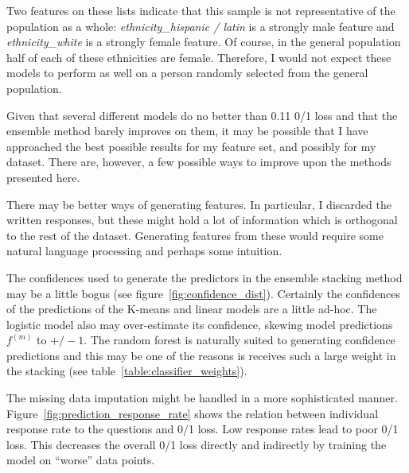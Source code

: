 \documentclass{article} %
\begin{document}
Two features on these lists indicate that this sample is not representative of the population as a whole: \textit{ethnicity\_hispanic / latin} is a strongly male feature and \textit{ethnicity\_white} is a strongly female feature.  Of course, in the general population half of each of these ethnicities are female.  Therefore, I would not expect these models to perform as well on a person randomly selected from the general population.


Given that several different models do no better than 0.11 0/1 loss and that the ensemble method barely improves on them, it may be possible that I have approached the best possible results for my feature set, and possibly for my dataset.  There are, however, a few possible ways to improve upon the methods presented here.

There may be better ways of generating features.  In particular, I discarded the written responses, but these might hold a lot of information which is orthogonal to the rest of the dataset.  Generating features from these would require some natural language processing and perhaps some intuition.

The confidences used to generate the predictors in the ensemble stacking method may be a little bogus (see figure~\ref{fig:confidence_dist}).  Certainly the confidences of the predictions of the K-means and linear models are a little ad-hoc.  The logistic model also may over-estimate its confidence, skewing model predictions $f^{(m)}$ to $+/-1$.  The random forest is naturally suited to generating confidence predictions and this may be one of the reasons is receives such a large weight in the stacking (see table~\ref{table:classifier_weights}).

The missing data imputation might be handled in a more sophisticated manner.  Figure~\ref{fig:prediction_response_rate} shows the relation between individual response rate to the questions and 0/1 loss.  Low response rates lead to poor 0/1 loss.  This decreases the overall 0/1 loss directly and indirectly by training the model on ``worse'' data points.  
\end{document}
